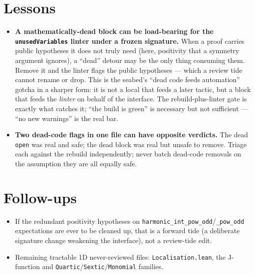 \documentclass[11pt]{article}
\begin{document}
\section{Lessons}
\begin{itemize}[noitemsep]
  \item \textbf{A mathematically-dead block can be load-bearing for the \texttt{unusedVariables} linter under
    a frozen signature.} When a proof carries public hypotheses it does not truly need (here, positivity that
    a symmetry argument ignores), a ``dead'' detour may be the only thing consuming them. Remove it and the
    linter flags the public hypotheses --- which a review tide cannot rename or drop. This is the seabed's
    ``dead code feeds automation'' gotcha in a sharper form: it is not a local that feeds a later tactic, but
    a block that feeds the \emph{linter} on behalf of the interface. The rebuild-plus-linter gate is exactly
    what catches it; ``the build is green'' is necessary but not sufficient --- ``no new warnings'' is the
    real bar.
  \item \textbf{Two dead-code flags in one file can have opposite verdicts.} The dead \texttt{open} was real
    and safe; the dead block was real but unsafe to remove. Triage each against the rebuild independently;
    never batch dead-code removals on the assumption they are all equally safe.
\end{itemize}

\section{Follow-ups}
\begin{itemize}[noitemsep]
  \item If the redundant positivity hypotheses on \texttt{harmonic\_int\_pow\_odd}/\texttt{\_pow\_odd}
    expectations are ever to be cleaned up, that is a forward tide (a deliberate signature change weakening
    the interface), not a review-tide edit.
  \item Remaining tractable 1D never-reviewed files: \texttt{Localisation.lean}, the J-function and
    \texttt{Quartic}/\texttt{Sextic}/\texttt{Monomial} families.
\end{itemize}
\end{document}
